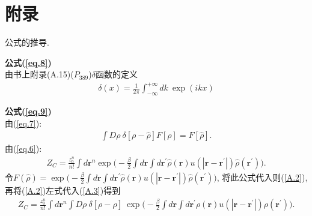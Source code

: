 
    \section{附录}
    公式的推导.
    \par
    \textbf{公式(\ref{eq.8})}
    \\
    由书上附录(A.15)($P_{389}$)$\delta$函数的定义
\label{subsec.equations}
    \begin{equation}
        \begin{aligned}
            \delta(x)=\frac{1}{2\pi}\int^{+\infty}_{-\infty}dk\ \exp(ikx)
        \end{aligned}
        \label{A.1}
    \end{equation}
    \par
    \textbf{公式(\ref{eq.9})} 
    \\
    由(\ref{eq.7}):
\label{subsec.equations}
   \begin{equation}
       \begin{aligned}
           \int D\rho\ \delta[\rho-\hat{\rho}]F[\rho]=F[\hat{\rho}].
         \end{aligned}
       \label{A.2}
    \end{equation}
    由(\ref{eq.6}):
  \begin{equation}
        \begin{aligned}
              Z_C=\frac{z_0^n}{n!} \int d\bm{r}^n \exp \big( -\frac{\beta}{2}\int d\bm{r}\int
           d\bm{r^{'}}\hat{\rho}(\bm{r})u(|\bm{r}-\bm{r^{'}}|)\hat{\rho}(\bm{r^{'}})
           \big).
        \end{aligned}
        \label{A.3}
\end{equation}
    令$F(\hat{\rho})=\exp \big( -\frac{\beta}{2}\int d\bm{r}\int
           d\bm{r^{'}}\hat{\rho}(\bm{r})u(|\bm{r}-\bm{r^{'}}|)\hat{\rho}(\bm{r^{'}})
           \big)$, 将此公式代入则(\ref{A.2}),
           再将(\ref{A.2})左式代入(\ref{A.3})得到
 \begin{equation}
        \begin{aligned}
            Z_C=\frac{z_0^n}{n!} \int d\bm{r}^n \int
            D\rho\ \delta[\rho-\hat{\rho}]\ \exp \big( -\frac{\beta}{2}\int d\bm{r}\int
           d\bm{r^{'}}\rho(\bm{r})u(|\bm{r}-\bm{r^{'}}|)\rho(\bm{r^{'}})
           \big).
        \end{aligned}
        \label{A.4}
\end{equation}

